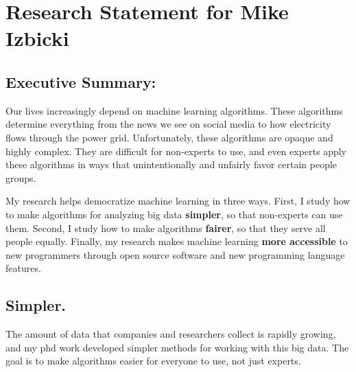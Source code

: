 \documentclass[12pt]{article}
\begin{document}
\section*{Research Statement for Mike Izbicki}

\subsection*{Executive Summary:}

Our lives increasingly depend on machine learning algorithms.
These algorithms determine everything from the news we see on social media to how electricity flows through the power grid.
Unfortunately, these algorithms are opaque and highly complex.
They are difficult for non-experts to use, and
even experts apply these algorithms in ways that unintentionally and unfairly favor certain people groups.



My research helps democratize machine learning in three ways.
First, I study how to make algorithms for analyzing big data \textbf{simpler},
so that non-experts can use them.
Second, I study how to make algorithms \textbf{fairer},
so that they serve all people equally.
Finally, my research makes machine learning \textbf{more accessible} to new programmers through open source software and new programming language features.



\vspace{-0.15in}
\subsection*{Simpler.}

The amount of data that companies and researchers collect is rapidly growing,
and my phd work developed simpler methods for working with this big data.
The goal is to make algorithms easier for everyone to use, 
not just experts.
\end{document}
